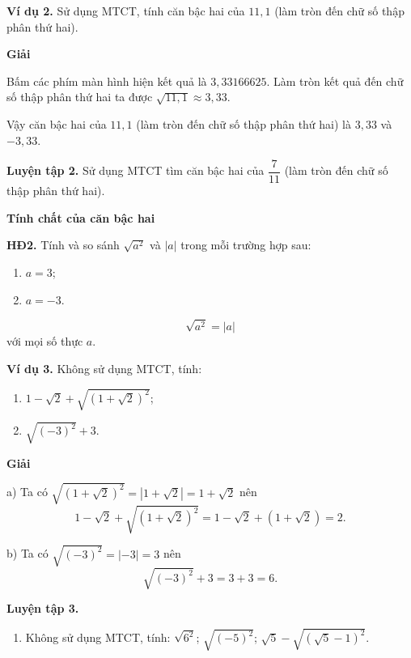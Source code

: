 \begin{lesson}
    \textbf{Ví dụ 2.} Sử dụng MTCT, tính căn bậc hai của $11{,}1$ (làm tròn đến chữ số thập phân thứ hai).

    \textbf{Giải}

    Bấm các phím
    màn hình hiện kết quả là $3{,}33166625$. Làm tròn kết quả đến chữ số thập phân thứ hai ta được $\sqrt{11{,}1}\approx3{,}33$.

    Vậy căn bậc hai của $11{,}1$ (làm tròn đến chữ số thập phân thứ hai) là $3{,}33$ và $-3{,}33$.

    \textbf{Luyện tập 2.} Sử dụng MTCT tìm căn bậc hai của $\dfrac{7}{11}$ (làm tròn đến chữ số thập phân thứ hai).

    \answerline

    \textbf{Tính chất của căn bậc hai}

    \textbf{HĐ2.} Tính và so sánh $\sqrt{a^2}$ và $|a|$ trong mỗi trường hợp sau:
    \begin{enumerate}[label=\alph*)]
        \item $a=3$;
        \item $a=-3$.
    \end{enumerate}

    \answerline

    \begin{keyconcept}
        \[
            \sqrt{a^2}=|a|
        \]
        với mọi số thực $a$.
    \end{keyconcept}

    \textbf{Ví dụ 3.} Không sử dụng MTCT, tính:
    \begin{enumerate}[label=\alph*)]
        \item $1-\sqrt{2}+\sqrt{(1+\sqrt{2})^2}$;
        \item $\sqrt{(-3)^2}+3$.
    \end{enumerate}

    \textbf{Giải}

    a) Ta có $\sqrt{(1+\sqrt{2})^2}=|1+\sqrt{2}|=1+\sqrt{2}$ nên
    \[
        1-\sqrt{2}+\sqrt{(1+\sqrt{2})^2}
        =1-\sqrt{2}+(1+\sqrt{2})=2.
    \]

    b) Ta có $\sqrt{(-3)^2}=|-3|=3$ nên
    \[
        \sqrt{(-3)^2}+3=3+3=6.
    \]

    \textbf{Luyện tập 3.}
    \begin{enumerate}[label=\alph*)]
        \item Không sử dụng MTCT, tính: $\sqrt{6^2}$; $\sqrt{(-5)^2}$; $\sqrt{5}-\sqrt{(\sqrt{5}-1)^2}$.


\end{enumerate}
\end{lesson}
